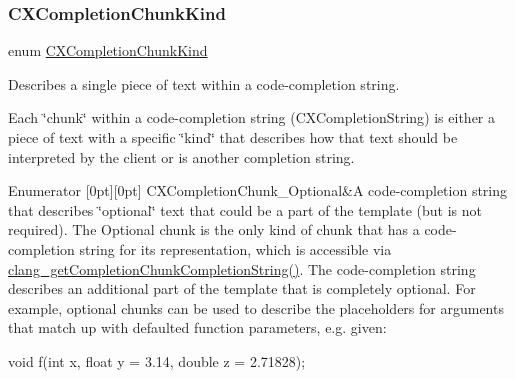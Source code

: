 \subsubsection{\texorpdfstring{C\+X\+Completion\+Chunk\+Kind}{CXCompletionChunkKind}}
{\footnotesize\ttfamily enum \hyperlink{group__CINDEX__CODE__COMPLET_ga82570056548565efdd6fc74e57e75bbd}{C\+X\+Completion\+Chunk\+Kind}}



Describes a single piece of text within a code-\/completion string. 

Each \char`\"{}chunk\char`\"{} within a code-\/completion string ({\ttfamily C\+X\+Completion\+String}) is either a piece of text with a specific \char`\"{}kind\char`\"{} that describes how that text should be interpreted by the client or is another completion string. \begin{DoxyEnumFields}{Enumerator}
[0pt][0pt]{}\mbox{\label{group__CINDEX__CODE__COMPLET_gga82570056548565efdd6fc74e57e75bbdacb5795145d840263ac0f4ce7292c917f}} 
C\+X\+Completion\+Chunk\+\_\+\+Optional&A code-\/completion string that describes \char`\"{}optional\char`\"{} text that could be a part of the template (but is not required). The Optional chunk is the only kind of chunk that has a code-\/completion string for its representation, which is accessible via {\ttfamily \hyperlink{group__CINDEX__CODE__COMPLET_ga3063e36e81b3e14809f87bdc841a3a9d}{clang\+\_\+get\+Completion\+Chunk\+Completion\+String()}}. The code-\/completion string describes an additional part of the template that is completely optional. For example, optional chunks can be used to describe the placeholders for arguments that match up with defaulted function parameters, e.\+g. given\+:


\begin{DoxyCode}
void f(int x, float y = 3.14, double z = 2.71828);
\end{DoxyCode}



\end{DoxyEnumFields}
